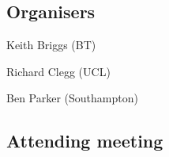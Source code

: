 \documentclass[10pt]{article}
\newenvironment{packed_item}{
\begin{itemize}
  \setlength{\itemsep}{1pt}
  \setlength{\parskip}{0pt}
  \setlength{\parsep}{0pt}
}{\end{itemize}}
\begin{document}
\begin{multicols}{2}

\subsection*{Organisers}

\begin{packed_item}
\item    Keith Briggs (BT)
\item    Richard Clegg (UCL)
\item    Ben Parker (Southampton)
\end{packed_item}

\subsection*{Attending meeting}


\end{multicols}
\end{document}
